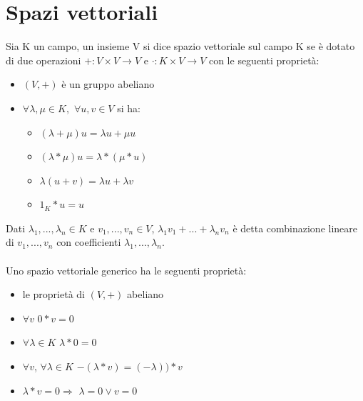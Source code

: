 \documentclass{article}
\begin{document}
\section{Spazi vettoriali}
Sia K un campo, un insieme V si dice spazio vettoriale sul campo K se è dotato di due operazioni $+:V\times V\rightarrow V$ e $\cdot:K\times V\rightarrow V$ con le seguenti proprietà:
\begin{itemize}
    \item $(V,+)$ è un gruppo abeliano
    \item $\forall \lambda,\mu\in K,$ $\forall u,v\in V$ si ha:
    \begin{itemize}
        \item $(\lambda+\mu)u=\lambda u + \mu u$
        \item $(\lambda*\mu)u=\lambda*(\mu*u)$
        \item $\lambda(u+v)=\lambda u + \lambda v$
        \item $1_K*u=u$
    \end{itemize}
\end{itemize}
Dati $\lambda_1,...,\lambda_n\in K$ e $v_1,...,v_n\in V$, $\lambda_1v_1+...+\lambda_nv_n$ è detta combinazione lineare di $v_1,...,v_n$ con coefficienti $\lambda_1,...,\lambda_n$.\\\\
Uno spazio vettoriale generico ha le seguenti proprietà:
\begin{itemize}
    \item le proprietà di $(V,+)$ abeliano
    \item $\forall v$ $0*v=0$
    \item $\forall \lambda\in K$ $\lambda*0=0$
    \item $\forall v$, $\forall \lambda\in K$ $-(\lambda*v)=(-\lambda))*v$
    \item $\lambda*v=0\Rightarrow$ $\lambda=0\vee v=0$
\end{itemize}
\end{document}
